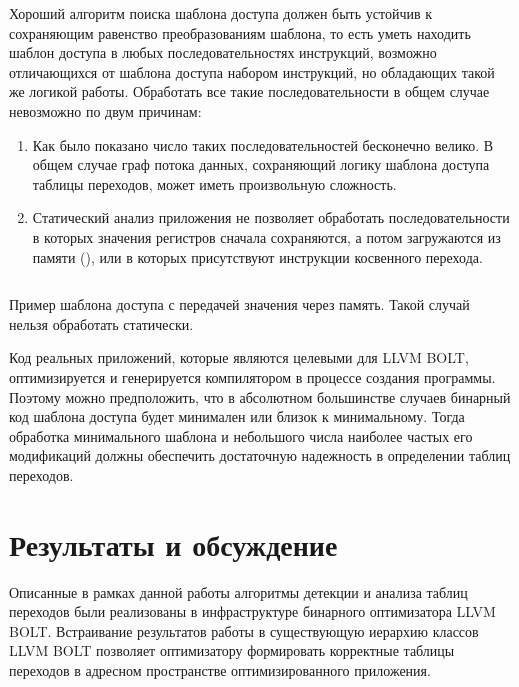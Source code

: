 \documentclass{mipt-thesis-bs}
\begin{document}
    Хороший алгоритм поиска шаблона доступа должен быть устойчив к сохраняющим равенство преобразованиям шаблона, то есть уметь находить шаблон доступа в любых последовательностях инструкций, возможно отличающихся от шаблона доступа набором инструкций, но обладающих такой же логикой работы. Обработать все такие последовательности в общем случае невозможно по двум причинам:
    \begin{enumerate}
        \item Как было показано число таких последовательностей бесконечно велико. В общем случае граф потока данных, сохраняющий логику шаблона доступа таблицы переходов, может иметь произвольную сложность.
        \item Статический анализ приложения не позволяет обработать последовательности в которых значения регистров сначала сохраняются, а потом загружаются из памяти (), или в которых присутствуют инструкции косвенного перехода.
    \end{enumerate}

    \begin{listing}[h!]
        \inputminted[highlightlines={3,5}]{gas}{src/error_example.s}
        \caption{Пример шаблона доступа с передачей значения через память. Такой случай нельзя обработать статически.}
        \label{fig:memory-error}
    \end{listing}

    Код реальных приложений, которые являются целевыми для LLVM BOLT, оптимизируется и генерируется компилятором в процессе создания программы. Поэтому можно предположить, что в абсолютном большинстве случаев бинарный код шаблона доступа будет минимален или близок к минимальному. Тогда обработка минимального шаблона и небольшого числа наиболее частых его модификаций должны обеспечить достаточную надежность в определении таблиц переходов.

    \chapter{Результаты и обсуждение}
    Описанные в рамках данной работы алгоритмы детекции и анализа таблиц переходов были реализованы в инфраструктуре бинарного оптимизатора LLVM BOLT. Встраивание результатов работы в существующую иерархию классов LLVM BOLT позволяет оптимизатору формировать корректные таблицы переходов в адресном пространстве оптимизированного приложения.
\end{document}
